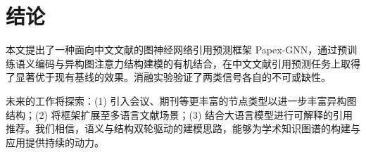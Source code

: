 \section{结论}
本文提出了一种面向中文文献的图神经网络引用预测框架 Papex-GNN，通过预训练语义编码与异构图注意力结构建模的有机结合，在中文文献引用预测任务上取得了显著优于现有基线的效果。消融实验验证了两类信号各自的不可或缺性。

未来的工作将探索：(1) 引入会议、期刊等更丰富的节点类型以进一步丰富异构图结构；(2) 将框架扩展至多语言文献场景；(3) 结合大语言模型进行可解释的引用推荐。我们相信，语义与结构双轮驱动的建模思路，能够为学术知识图谱的构建与应用提供持续的动力。
